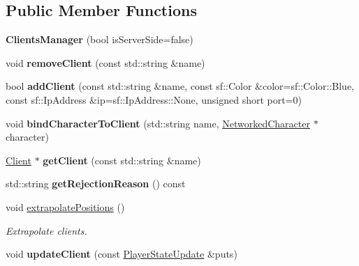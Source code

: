 \subsection*{Public Member Functions}
\begin{DoxyCompactItemize}
\item 
\hypertarget{class_clients_manager_af50b8efec34aa37dd60f599dda9fdc57}{{\bfseries Clients\-Manager} (bool is\-Server\-Side=false)}\label{class_clients_manager_af50b8efec34aa37dd60f599dda9fdc57}

\item 
\hypertarget{class_clients_manager_a60d59eb27425056cf2522420a1634f61}{void {\bfseries remove\-Client} (const std\-::string \&name)}\label{class_clients_manager_a60d59eb27425056cf2522420a1634f61}

\item 
\hypertarget{class_clients_manager_a0500fc808d435266e54b2b3f4640db77}{bool {\bfseries add\-Client} (const std\-::string \&name, const sf\-::\-Color \&color=sf\-::\-Color\-::\-Blue, const sf\-::\-Ip\-Address \&ip=sf\-::\-Ip\-Address\-::\-None, unsigned short port=0)}\label{class_clients_manager_a0500fc808d435266e54b2b3f4640db77}

\item 
\hypertarget{class_clients_manager_a90424f43cd357ca551625b68fa0854de}{void {\bfseries bind\-Character\-To\-Client} (std\-::string name, \hyperlink{class_networked_character}{Networked\-Character} $\ast$character)}\label{class_clients_manager_a90424f43cd357ca551625b68fa0854de}

\item 
\hypertarget{class_clients_manager_a1a3c6b502614cddb492ff1c58686e82f}{\hyperlink{class_client}{Client} $\ast$ {\bfseries get\-Client} (const std\-::string \&name)}\label{class_clients_manager_a1a3c6b502614cddb492ff1c58686e82f}

\item 
\hypertarget{class_clients_manager_a9c6bfceac0cb4fbe9bcbd367df272b50}{std\-::string {\bfseries get\-Rejection\-Reason} () const }\label{class_clients_manager_a9c6bfceac0cb4fbe9bcbd367df272b50}

\item 
void \hyperlink{class_clients_manager_ae55a1c248752d118e56da6e5a5dfa429}{extrapolate\-Positions} ()
\begin{DoxyCompactList}\small\item\em Extrapolate clients. \end{DoxyCompactList}\item 
\hypertarget{class_clients_manager_ae1bb4da6d7e6a0e5731e23811eb5dbc2}{void {\bfseries update\-Client} (const \hyperlink{class_player_state_update}{Player\-State\-Update} \&puts)}\label{class_clients_manager_ae1bb4da6d7e6a0e5731e23811eb5dbc2}


\end{DoxyCompactItemize}

